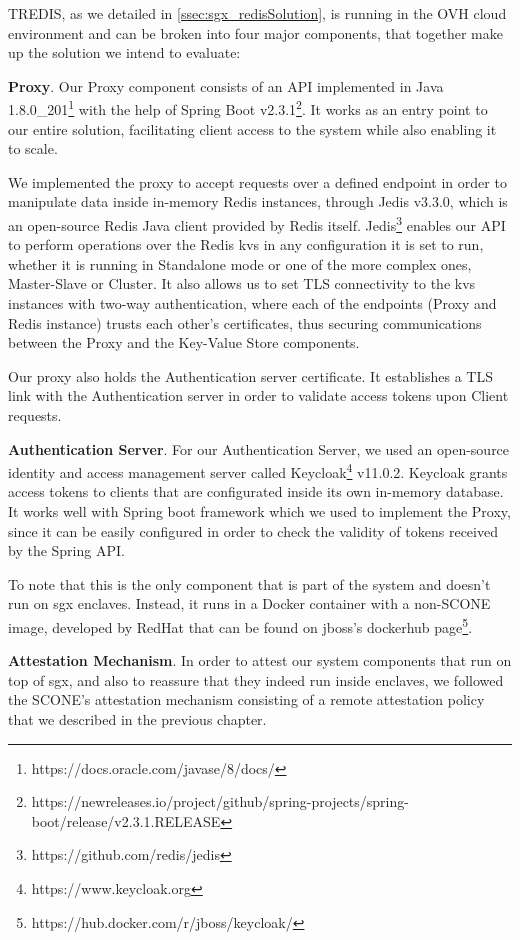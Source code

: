 TREDIS, as we detailed in \ref{ssec:sgx_redisSolution}, is running in the OVH cloud environment and can be broken into four major components, that together make up the solution we intend to evaluate:

\textbf{Proxy}. Our Proxy component consists of an API implemented in Java 1.8.0\_201\footnote{https://docs.oracle.com/javase/8/docs/} with the help of Spring Boot v2.3.1\footnote{https://newreleases.io/project/github/spring-projects/spring-boot/release/v2.3.1.RELEASE}. It works as an entry point to our entire solution, facilitating client access to the system while also enabling it to scale. 

We implemented the proxy to accept requests over a defined endpoint in order to manipulate data inside in-memory Redis instances, through Jedis v3.3.0, which is an open-source Redis Java client provided by Redis itself. Jedis\footnote{https://github.com/redis/jedis} enables our API to perform operations over the Redis \gls{kvs} in any configuration it is set to run, whether it is running in Standalone mode or one of the more complex ones, Master-Slave or Cluster. It also allows us to set TLS connectivity to the \gls{kvs} instances with two-way authentication, where each of the endpoints (Proxy and Redis instance) trusts each other's certificates, thus securing communications between the Proxy and the Key-Value Store components.

Our proxy also holds the Authentication server certificate. It establishes a TLS link with the Authentication server in order to validate access tokens upon Client requests.

\vspace{3mm}
\textbf{Authentication Server}. For our Authentication Server, we used an open-source identity and access management server called Keycloak\footnote{https://www.keycloak.org} v11.0.2. Keycloak grants access tokens to clients that are configurated inside its own in-memory database. It works well with Spring boot framework which we used to implement the Proxy, since it can be easily configured in order to check the validity of tokens received by the Spring API.

To note that this is the only component that is part of the system and doesn't run on \gls{sgx} enclaves. Instead, it runs in a Docker container with a non-SCONE image, developed by RedHat that can be found on jboss's dockerhub page\footnote{https://hub.docker.com/r/jboss/keycloak/}.

\vspace{3mm}
\textbf{Attestation Mechanism}. In order to attest our system components that run on top of \gls{sgx}, and also to reassure that they indeed run inside enclaves, we followed the SCONE's attestation mechanism consisting of a remote attestation policy that we described in the previous chapter. 

